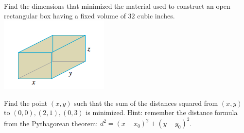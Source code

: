 \documentclass[12pt, a4paper]{article}
\begin{document}
\begin{ex}
  Find the dimensions that minimized the material used to construct an
  open rectangular box having a fixed volume 
  of \(32\) cubic inches.
  \\ \includegraphics[scale=0.75]{images/open-box}
\end{ex}
\begin{ex}
  Find the point \((x,y)\) such that the sum of the distances squared
  from \((x,y)\) to \((0,0), (2,1), (0,3)\) is minimized. Hint:
  remember the distance formula from the Pythagorean theorem: \(d^2 =
  (x-x_0)^2 + (y-y_0)^2\).
\end{ex}
\end{document}
